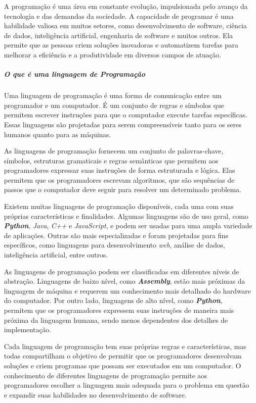 \documentclass[a4paper, 12pt, onecolumn,singlespacing]{article}
\begin{document}
	A programação é uma área em constante evolução, impulsionada pelo avanço da tecnologia e das demandas da sociedade. A capacidade de programar é uma habilidade valiosa em muitos setores, como desenvolvimento de software, ciência de dados, inteligência artificial, engenharia de software e muitos outros. Ela permite que as pessoas criem soluções inovadoras e automatizem tarefas para melhorar a eficiência e a produtividade em diversos campos de atuação.
	
	\subparagraph{O que é uma linguagem de Programação} \label{o_que_e_linguagem_de_programacao} Uma linguagem de programação é uma forma de comunicação entre um programador e um computador. É um conjunto de regras e símbolos que permitem escrever instruções para que o computador execute tarefas específicas. Essas linguagens são projetadas para serem compreensíveis tanto para os seres humanos quanto para as máquinas.
	
	As linguagens de programação fornecem um conjunto de palavras-chave, símbolos, estruturas gramaticais e regras semânticas que permitem aos programadores expressar suas instruções de forma estruturada e lógica. Elas permitem que os programadores escrevam algoritmos, que são sequências de passos que o computador deve seguir para resolver um determinado problema.
	
	Existem muitas linguagens de programação disponíveis, cada uma com suas próprias características e finalidades. Algumas linguagens são de uso geral, como \textbf{\textit{Python}}, \textit{Java}, \textit{C++} e \textit{JavaScript}, e podem ser usadas para uma ampla variedade de aplicações. Outras são mais especializadas e foram projetadas para fins específicos, como linguagens para desenvolvimento \textit{web}, análise de dados, inteligência artificial, entre outros.
	
	As linguagens de programação podem ser classificadas em diferentes níveis de abstração. Linguagens de baixo nível, como \textit{\textbf{Assembly}}, estão mais próximas da linguagem de máquina e requerem um conhecimento mais detalhado do hardware do computador. Por outro lado, linguagens de alto nível, como \textbf{\textit{Python}}, permitem que os programadores expressem suas instruções de maneira mais próxima da linguagem humana, sendo menos dependentes dos detalhes de implementação.
	
	Cada linguagem de programação tem suas próprias regras e características, mas todas compartilham o objetivo de permitir que os programadores desenvolvam soluções e criem programas que possam ser executados em um computador. O conhecimento de diferentes linguagens de programação permite aos programadores escolher a linguagem mais adequada para o problema em questão e expandir suas habilidades no desenvolvimento de software.
	
\end{document}
